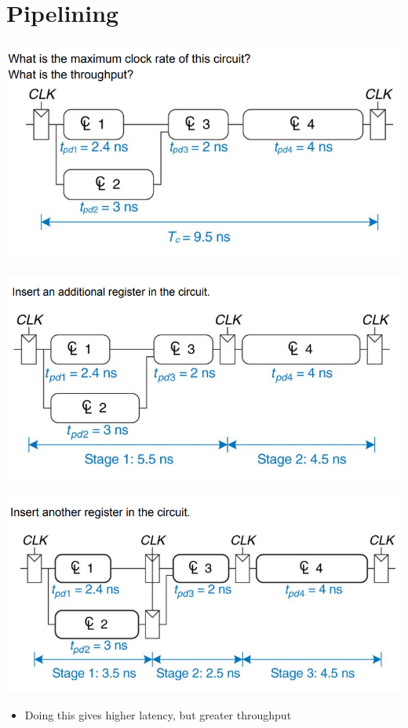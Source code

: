 \documentclass{article}[18pt]
\begin{document}
\section{Pipelining}
\begin{center}
	\includegraphics[scale=0.7]{figure24}
\end{center}
\begin{center}
	\includegraphics[scale=0.7]{figure25}
\end{center}
\begin{center}
	\includegraphics[scale=0.7]{figure26}
\end{center}
\begin{itemize}
	\item Doing this gives higher latency, but greater throughput
\end{itemize}
\end{document}
